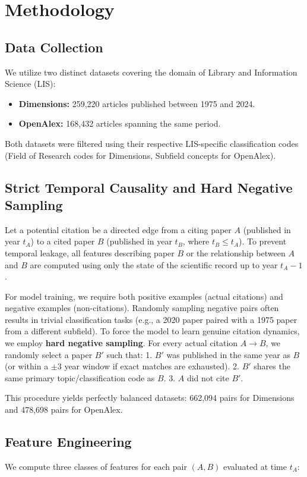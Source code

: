 \documentclass[11pt,a4paper]{article}
\begin{document}
\section{Methodology}

\subsection{Data Collection}
We utilize two distinct datasets covering the domain of Library and Information Science (LIS):
\begin{itemize}
    \item \textbf{Dimensions:} 259,220 articles published between 1975 and 2024.
    \item \textbf{OpenAlex:} 168,432 articles spanning the same period.
\end{itemize}
Both datasets were filtered using their respective LIS-specific classification codes (Field of Research codes for Dimensions, Subfield concepts for OpenAlex).

\subsection{Strict Temporal Causality and Hard Negative Sampling}
Let a potential citation be a directed edge from a citing paper $A$ (published in year $t_A$) to a cited paper $B$ (published in year $t_B$, where $t_B \le t_A$). To prevent temporal leakage, all features describing paper $B$ or the relationship between $A$ and $B$ are computed using only the state of the scientific record up to year $t_A - 1$.

For model training, we require both positive examples (actual citations) and negative examples (non-citations). Randomly sampling negative pairs often results in trivial classification tasks (e.g., a 2020 paper paired with a 1975 paper from a different subfield). To force the model to learn genuine citation dynamics, we employ \textbf{hard negative sampling}. For every actual citation $A \to B$, we randomly select a paper $B'$ such that:
1. $B'$ was published in the same year as $B$ (or within a $\pm 3$ year window if exact matches are exhausted).
2. $B'$ shares the same primary topic/classification code as $B$.
3. $A$ did not cite $B'$.

This procedure yields perfectly balanced datasets: 662,094 pairs for Dimensions and 478,698 pairs for OpenAlex.

\subsection{Feature Engineering}
We compute three classes of features for each pair $(A, B)$ evaluated at time $t_A$:
\end{document}
